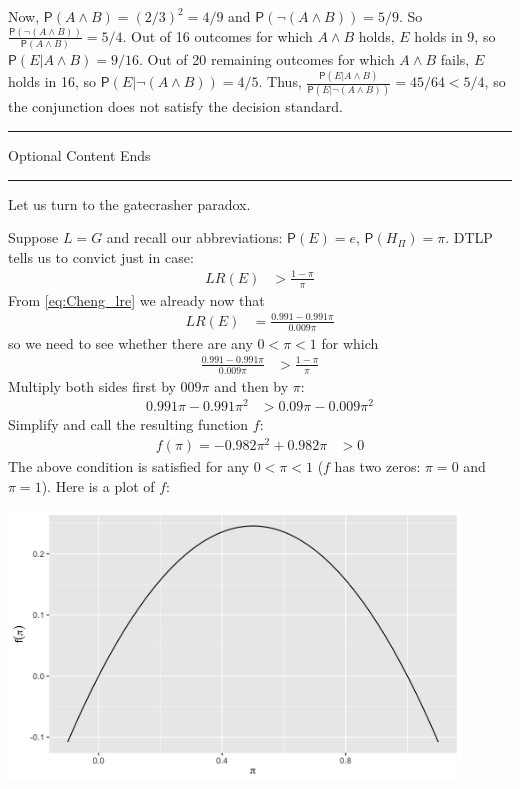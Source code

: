 \documentclass[
  10pt,
  dvipsnames,enabledeprecatedfontcommands]{scrartcl}
\newcommand{\n}{\neg}
\newcommand{\et}{\wedge}
\newcommand{\pr}[1]{\mathsf{P}(#1)}
\newcommand{\intermezzob}{\nopagebreak 
	\begin{minipage}[c]{13cm}
	\begin{center}\rule{10cm}{0.4pt}

	\tiny{\sc Optional Content Ends}
	
	\vspace{-1mm}
	
	\rule{10cm}{0.4pt}\end{center}
	\end{minipage}
	}
\begin{document}
Now, \(\pr{A\et B}=(2/3)^2=4/9\) and \(\pr{\n (A\et B)}=5/9\). So
\(\frac{\pr{\n(A\et B)}}{\pr{A\et B}}=5/4\). Out of 16 outcomes for
which \(A\et B\) holds, \(E\) holds in 9, so
\(\pr{E\vert A\et B}=9/16\). Out of 20 remaining outcomes for which
\(A\et B\) fails, \(E\) holds in 16, so \(\pr{E\vert \n (A\et B)}=4/5\).
Thus, \(\frac{\pr{E\vert A\et B}}{\pr{E\vert \n (A\et B)}}=45/64 <5/4\),
so the conjunction does not satisfy the decision standard.

\intermezzob

Let us turn to the gatecrasher paradox.

Suppose \(L=G\) and recall our abbreviations: \(\pr{E}=e\),
\(\pr{H_\Pi}=\pi\). DTLP tells us to convict just in case:
\begin{align*}
 LR(E) &> \frac{1-\pi}{\pi}
 \end{align*} \noindent From \eqref{eq:Cheng_lre} we already now that
\begin{align*}
 LR(E) & = \frac{0.991-0.991\pi}{0.009\pi}
 \end{align*} \noindent so we need to see whether there are any
\(0<\pi<1\) for which\\
\begin{align*}
  \frac{0.991-0.991\pi}{0.009\pi} &> \frac{1-\pi}{\pi}
 \end{align*} \noindent Multiply both sides first by \(009\pi\) and then
by \(\pi\): \begin{align*}
 0.991\pi - 0.991\pi^2 &> 0.09\pi - 0.009\pi^2
 \end{align*} \noindent Simplify and call the resulting function \(f\):
\begin{align*}
 f(\pi) = - 0.982 \pi^2 + 0.982\pi &>0 
 \end{align*} \noindent The above condition is satisfied for any
\(0<\pi <1\) (\(f\) has two zeros: \(\pi = 0\) and \(\pi = 1\)). Here is
a plot of \(f\):

\includegraphics[width=12cm]{f-gate.png}
\end{document}
